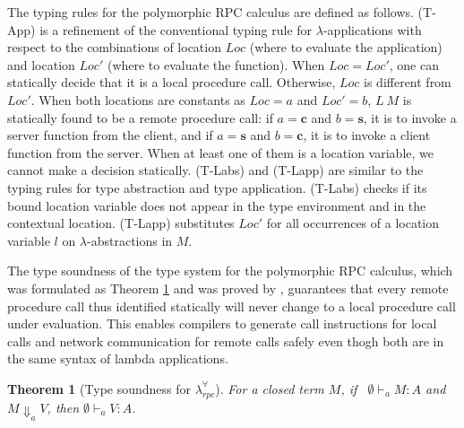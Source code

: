 \documentclass[a4paper]{article}
\theoremstyle{plain}
\newtheorem{theorem}{Theorem}
\theoremstyle{definition}
\newcommand{\polyrpc}{$\lambda_{rpc}^{\forall}$\xspace}
\newcommand{\client}{\textbf{c}}
\newcommand{\server}{\textbf{s}}
\newcommand{\evalRPC}[3]{#1\Downarrow_{#2}#3}
\newcommand{\typing}[4]{#1\vdash_{#2} #3 : #4}
\newcommand{\Loc}{Loc}
\begin{document}
The typing rules for the polymorphic RPC calculus are defined as
follows.
%
(T-App) is a refinement of the conventional typing rule for
$\lambda$-applications with respect to the combinations of location
$\Loc$ (where to evaluate the application) and location $\Loc'$ (where
to evaluate the function).
%
When $\Loc=\Loc'$, one can statically decide that it is a local
procedure call.
%
Otherwise, $\Loc$ is different from $\Loc'$.
%
When both locations are constants as $\Loc=a$ and $\Loc'=b$, $L \ M$
is statically found to be a remote procedure call: if $a=\client$ and
$b=\server$, it is to invoke a server function from the client, and if
$a=\server$ and $b=\client$, it is to invoke a client function from
the server.
%
When at least one of them is a location variable, we cannot make a
decision statically.
%
(T-Labs) and (T-Lapp) are similar to the typing rules for type
abstraction and type application.
%
(T-Labs) checks if its bound location variable does not appear in the
type environment and in the contextual location.
%
(T-Lapp) substitutes $\Loc'$ for all occurrences of a location
variable $l$ on $\lambda$-abstractions in $M$.

The type soundness of the type system for the polymorphic RPC
calculus, which was formulated as Theorem \ref{thm:typesoundness} and
was proved by \cite{CHOI:scp2020}, guarantees that every remote
procedure call thus identified statically will never change to a local
procedure call under evaluation.
%
This enables compilers to generate call instructions for local calls
and network communication for remote calls safely even thogh both are
in the same syntax of lambda applications.

\begin{theorem}[Type soundness for \polyrpc \cite{CHOI:scp2020}]
For a closed term $M$, if \ $\typing{\emptyset}{a}{M}{A}$ and
$\evalRPC{M}{a}{V}$, then $\typing{\emptyset}{a}{V}{A}$.
\label{thm:typesoundness}
\end{theorem}

	
	
\end{document}
